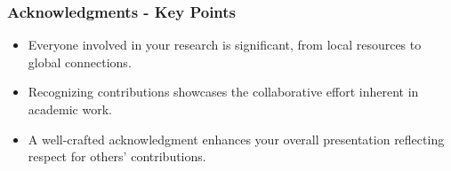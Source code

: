 \documentclass[aspectratio=169]{beamer}
\begin{document}
\begin{frame}[fragile]
    \frametitle{Acknowledgments - Key Points}
    \begin{itemize}
        \item Everyone involved in your research is significant, from local resources to global connections.
        
        \item Recognizing contributions showcases the collaborative effort inherent in academic work.
        
        \item A well-crafted acknowledgment enhances your overall presentation reflecting respect for others' contributions.
    \end{itemize}
\end{frame}
\end{document}
